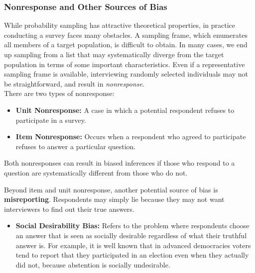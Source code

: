 \documentclass{article}
\begin{document}
    \subsubsection{Nonresponse and Other Sources of Bias}

    \noindent While probability sampling has attractive theoretical
properties, in practice conducting a survey faces many obstacles. A sampling
frame, which enumerates all members of a target population, is difficult to
obtain. In many cases, we end up sampling from a list that may
systematically diverge from the target population in terms of some important
characteristics. Even if a representative sampling frame is available,
interviewing randomly selected individuals may not be straightforward, and
result in \textit{nonresponse}.\\

    \noindent There are two types of nonresponse:
    \begin{itemize}
        \item \textbf{Unit Nonresponse:} A case in which a potential
        respondent refuses to participate in a survey.
        \item \textbf{Item Nonresponse:} Occurs when a respondent who agreed
        to participate refuses to answer a particular question.
    \end{itemize}

    \noindent Both nonresponses can result in biased inferences if those who
respond to a question are systematically different from those who do not.

    \noindent Beyond item and unit nonresponse, another potential source of
bias is \textbf{misreporting}. Respondents may simply lie because they may
not want interviewers to find out their true answers.
    \begin{itemize}
        \item \textbf{Social Desirability Bias:} Refers to the problem where
        respondents choose an answer that is seen as socially desirable
        regardless of what their truthful answer is. For example, it is well
        known that in advanced democracies voters tend to report that they
        participated in an election even when they actually did not, because
        abstention is socially undesirable.
    \end{itemize}
\end{document}
